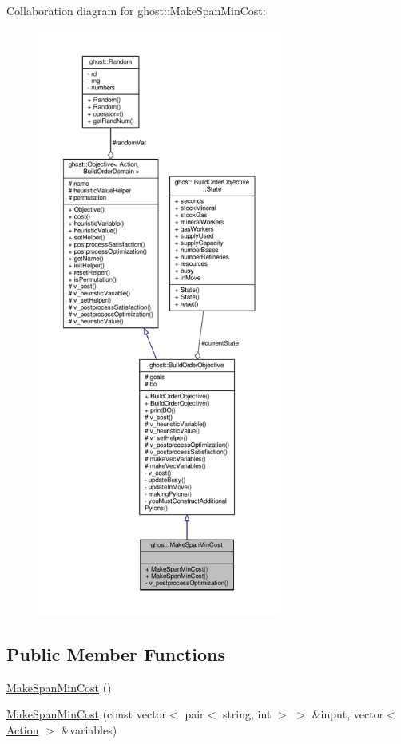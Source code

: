 Collaboration diagram for ghost\-:\-:Make\-Span\-Min\-Cost\-:
\nopagebreak
\begin{figure}[H]
\begin{center}
\leavevmode
\includegraphics[height=550pt]{classghost_1_1MakeSpanMinCost__coll__graph}
\end{center}
\end{figure}
\subsection*{Public Member Functions}
\begin{DoxyCompactItemize}
\item 
\hyperlink{classghost_1_1MakeSpanMinCost_a900db3b3d8979eb44b92f8175ac10735}{Make\-Span\-Min\-Cost} ()
\item 
\hyperlink{classghost_1_1MakeSpanMinCost_a523f42c1f9a07fa9c8041c6672b1ce2a}{Make\-Span\-Min\-Cost} (const vector$<$ pair$<$ string, int $>$ $>$ \&input, vector$<$ \hyperlink{classghost_1_1Action}{Action} $>$ \&variables)
\end{DoxyCompactItemize}
